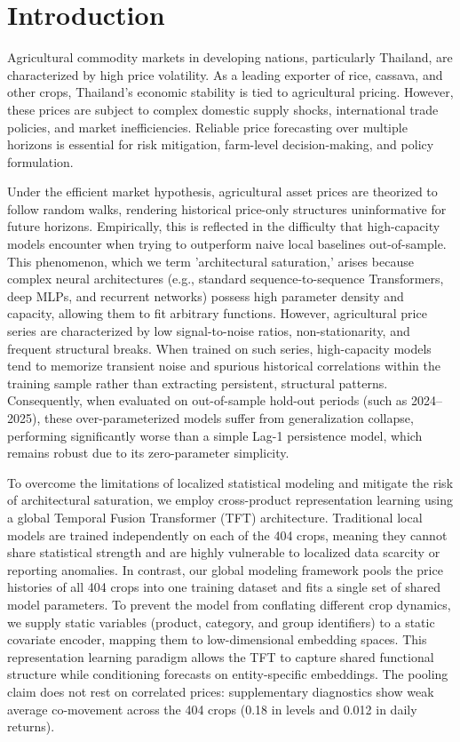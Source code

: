 \documentclass[review,3p,times]{elsarticle}
\begin{document}
\section{Introduction}

Agricultural commodity markets in developing nations, particularly Thailand, are characterized by high price volatility. As a leading exporter of rice, cassava, and other crops, Thailand's economic stability is tied to agricultural pricing. However, these prices are subject to complex domestic supply shocks, international trade policies, and market inefficiencies. Reliable price forecasting over multiple horizons is essential for risk mitigation, farm-level decision-making, and policy formulation.

Under the efficient market hypothesis, agricultural asset prices are theorized to follow random walks, rendering historical price-only structures uninformative for future horizons. Empirically, this is reflected in the difficulty that high-capacity models encounter when trying to outperform naive local baselines out-of-sample. This phenomenon, which we term 'architectural saturation,' arises because complex neural architectures (e.g., standard sequence-to-sequence Transformers, deep MLPs, and recurrent networks) possess high parameter density and capacity, allowing them to fit arbitrary functions. However, agricultural price series are characterized by low signal-to-noise ratios, non-stationarity, and frequent structural breaks. When trained on such series, high-capacity models tend to memorize transient noise and spurious historical correlations within the training sample rather than extracting persistent, structural patterns. Consequently, when evaluated on out-of-sample hold-out periods (such as 2024--2025), these over-parameterized models suffer from generalization collapse, performing significantly worse than a simple Lag-1 persistence model, which remains robust due to its zero-parameter simplicity.

To overcome the limitations of localized statistical modeling and mitigate the risk of architectural saturation, we employ cross-product representation learning using a global Temporal Fusion Transformer (TFT) architecture. Traditional local models are trained independently on each of the 404 crops, meaning they cannot share statistical strength and are highly vulnerable to localized data scarcity or reporting anomalies. In contrast, our global modeling framework pools the price histories of all 404 crops into one training dataset and fits a single set of shared model parameters. To prevent the model from conflating different crop dynamics, we supply static variables (product, category, and group identifiers) to a static covariate encoder, mapping them to low-dimensional embedding spaces. This representation learning paradigm allows the TFT to capture shared functional structure while conditioning forecasts on entity-specific embeddings. The pooling claim does not rest on correlated prices: supplementary diagnostics show weak average co-movement across the 404 crops (0.18 in levels and 0.012 in daily returns).
\end{document}
